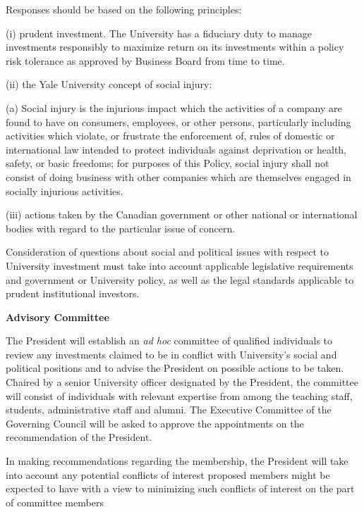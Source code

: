  

Responses should be based on the following principles:



(i) prudent investment. The University has a fiduciary duty to manage investments responsibly to maximize return on its investments within a policy risk tolerance as approved by Business Board from time to time.

 


(ii) the Yale University concept of social injury:

 

(a) Social injury is the injurious impact which the activities of a company are found to have on consumers, employees, or other persons, particularly including activities which violate, or frustrate the enforcement of, rules of domestic or international law intended to protect individuals against deprivation or health, safety, or basic freedoms; for purposes of this Policy, social injury shall not consist of doing business with other companies which are themselves engaged in socially injurious activities.

 

(iii) actions taken by the Canadian government or other national or international bodies with regard to the particular issue of concern.

 

Consideration of questions about social and political issues with respect to University investment must take into account applicable legislative requirements and government or University policy, as well as the legal standards applicable to prudent institutional investors.




\textbf{Advisory Committee}

 

The President will establish an \emph{ad hoc} committee of qualified individuals to review any investments claimed to be in conflict with University’s social and political positions and to advise the President on possible actions to be taken.  Chaired by a senior University officer designated by the President, the committee will consist of individuals with relevant expertise from among the teaching staff, students, administrative staff and alumni.  The Executive Committee of the Governing Council will be asked to approve the appointments on the recommendation of the President.

 

In making recommendations regarding the membership, the President will take into account any potential conflicts of interest proposed members might be expected to have with a view to minimizing such conflicts of interest on the part of committee members

